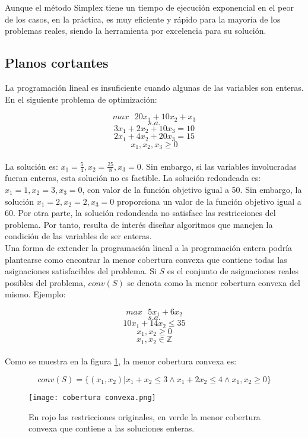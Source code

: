 \documentclass[12pt]{report}
\begin{document}
Aunque el método Simplex tiene un tiempo de ejecución exponencial en el peor de los casos, en la práctica, es muy eficiente y rápido para la mayoría de los problemas reales, siendo la herramienta por excelencia para su solución. 

\subsection{Planos cortantes}

La programación lineal es insuficiente cuando algunas de las variables son enteras. En el siguiente problema de optimización:

$$max \text{ } 20x_1+10x_2+x_3$$
$$s.a.$$
$$3x_1+2x_2+10x_3=10$$
$$2x_1+4x_2+20x_3=15$$
$$x_1,x_2,x_3\geq 0$$\\

La solución es: $x_1 = \frac54,x_2 = \frac{25}{8},x_3 = 0$. Sin embargo, si las variables involucradas fueran enteras, esta solución no es factible. La solución redondeada es: $x_1 = 1,x_2 = 3,x_3 = 0$, con valor de la función objetivo igual a 50. Sin embargo, la solución $x_1 = 2,x_2 = 2,x_3 = 0$ proporciona un valor de la función objetivo igual a 60. Por otra parte, la solución redondeada no satisface las restricciones del problema. Por tanto, resulta de interés diseñar algoritmos que manejen la condición de las variables de ser enteras.\\

Una forma de extender la programación lineal a la programación entera podría plantearse como encontrar la menor cobertura convexa que contiene todas las asignaciones satisfacibles del problema. Si $S$ es el conjunto de asignaciones reales posibles del problema, $conv(S)$ se denota como la menor cobertura convexa del mismo. Ejemplo:

$$max \text{ } 5x_1+6x_2$$
$$s.a.$$
$$10x_1+14x_2 \leq  35$$
$$x_1,x_2\geq 0$$
$$x_1,x_2\in\mathbb{Z}$$\\

Como se muestra en la figura \ref{fig:cobertura convexa}, la menor cobertura convexa es:

$$conv(S)=\{(x_1,x_2)|x_1+x_2\leq 3 \land x_1+2x_2\leq 4 \land x_1,x_2\geq 0\}$$

\begin{figure}[ht]
    \centering
    \texttt{[image: cobertura convexa.png]}
    \caption{En rojo las restricciones originales, en verde la menor cobertura convexa que contiene a las soluciones enteras.}
    \label{fig:cobertura convexa}
\end{figure}
\end{document}
